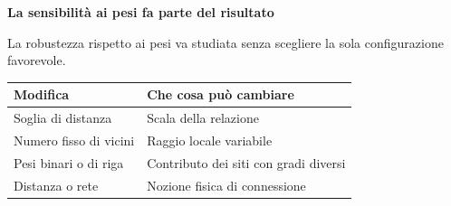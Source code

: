 \documentclass[12pt,aspectratio=1610]{beamer}
\newcommand{\PilotChrome}[4]{%
  \node[anchor=north west,inner sep=0,text width=17.7cm] at ([xshift=.95cm,yshift=-.55cm]current page.north west) {\color{Navy}\bfseries\fontsize{20.6}{24.5}\selectfont #1};
  \node[anchor=north east,inner sep=0] at ([xshift=19.05cm,yshift=-.14cm]current page.north west) {\color{Classical}\fontsize{8}{10}\selectfont\hyperlink{slide2}{#2}};
  \draw[Classical,line width=1.2pt] ([xshift=.95cm,yshift=-1.7cm]current page.north west)--([xshift=2.35cm,yshift=-1.7cm]current page.north west);
  \draw[Rule,line width=.65pt] ([xshift=.95cm,yshift=-10.36cm]current page.north west)--([xshift=19.05cm,yshift=-10.36cm]current page.north west);
  \node[anchor=north west,inner sep=0] at ([xshift=.96cm,yshift=-10.55cm]current page.north west) {\color{Classical}\bfseries\fontsize{9.1}{12}\selectfont DA RICORDARE};
  \node[anchor=north west,inner sep=0,text width=14.3cm] at ([xshift=4.2cm,yshift=-10.53cm]current page.north west) {\color{Ink}\fontsize{10.3}{13.8}\selectfont #4};
  \draw[Rule,line width=.35pt] ([xshift=.95cm,yshift=-11.92cm]current page.north west)--([xshift=19.05cm,yshift=-11.92cm]current page.north west);
  \node[anchor=north west,inner sep=0] at ([xshift=.95cm,yshift=-12.06cm]current page.north west) {\color{Muted}\fontsize{7.7}{9.2}\selectfont Locus: statistica spaziale};
  \node[anchor=north east,inner sep=0] at ([xshift=19.05cm,yshift=-12.06cm]current page.north west) {\color{Muted}\fontsize{7.7}{9.2}\selectfont #3/110};
}
\begin{document}
\begin{frame}[plain]
\begin{lrbox}{\PilotRightBox}
\begin{minipage}[t]{7.55cm}
\end{minipage}\end{lrbox}

\end{frame}

\begin{frame}[plain]\hypertarget{slide54}{}
\begin{lrbox}{\TitleBox}
\begin{minipage}[t]{17.7cm}\raggedright\color{Ink}\fontsize{11.3}{14.8}\selectfont
\color{Navy}\bfseries\fontsize{20.6}{24.5}\selectfont La sensibilità ai pesi fa parte del risultato
\end{minipage}\end{lrbox}

\begin{lrbox}{\RecallBox}
\begin{minipage}[t]{14.3cm}\raggedright\color{Ink}\fontsize{11.3}{14.8}\selectfont
\fontsize{10.3}{13.8}\selectfont La robustezza rispetto ai pesi va studiata senza scegliere la sola configurazione favorevole.
\end{minipage}\end{lrbox}

\begin{lrbox}{\PilotLeftBox}
\begin{minipage}[t]{10.05cm}\raggedright\color{Ink}\fontsize{11.3}{14.8}\selectfont
{\fontsize{10.2}{13.1}\selectfont\renewcommand{\arraystretch}{1.45}\begin{tabular}{@{}p{4.1cm}p{4.9cm}@{}}\toprule
\textbf{Modifica} & \textbf{Che cosa può cambiare}\\\midrule
Soglia di distanza & Scala della relazione\\
Numero fisso di vicini & Raggio locale variabile\\
Pesi binari o di riga & Contributo dei siti con gradi diversi\\
Distanza o rete & Nozione fisica di connessione\\
\bottomrule\end{tabular}}


\end{minipage}
\end{lrbox}
\end{frame}
\end{document}
